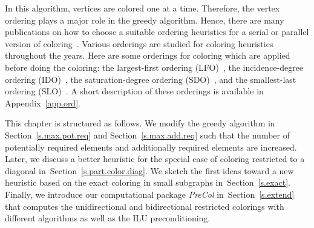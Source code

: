 \documentclass[12pt, twoside,a4paper,toc=bibliography]{scrbook}
\newcommand{\secref}[1]{Section~\protect\ref{#1}}
\newcommand{\appref}[1]{Appendix~\protect\ref{#1}}
\begin{document}
In this algorithm, vertices are colored one at a time.
Therefore, the vertex ordering plays a major role in the greedy algorithm.
Hence, there are many publications on how to choose
a suitable ordering heuristics for a serial or parallel version of
coloring~\cite{ordering1,ordering2,ordering3}.
Various orderings are studied for coloring heuristics
throughout the years. Here are some orderings for coloring which are applied before doing the coloring:
the largest-first ordering (LFO)~\cite{LFO}, the incidence-degree ordering (IDO)~\cite{IDO},
the saturation-degree ordering (SDO)~\cite{SDO}, and the smallest-last ordering (SLO)~\cite{ordering1}.
A short description of these orderings is available in \appref{app.ord}.

This chapter is structured as follows.
We modify the greedy algorithm in \secref{s.max.pot.req} and \secref{s.max.add.req}
 such that the number of potentially required elements
and additionally required elements are increased.
Later, we discuss a better heuristic for
the special case of coloring restricted to a diagonal in~\secref{s.part.color.diag}.
We sketch the first ideas toward a new heuristic based on the exact coloring in small
subgraphs in~\secref{s.exact}.
Finally, we introduce our computational package \textit{PreCol} 
in~\secref{s.extend} that computes the 
unidirectional and bidirectional restricted colorings with different algorithms
as well as the ILU preconditioning. 
\end{document}
